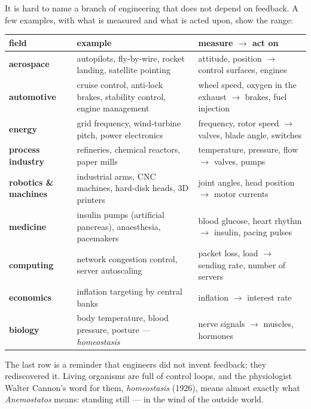 It is hard to name a branch of engineering that does not depend on feedback. A few examples, with what is measured and what is acted upon, show the range:

\begin{center}\small
\renewcommand{\arraystretch}{1.25}
\begin{tabularx}{\linewidth}{@{}>{\sffamily\bfseries}p{23mm}>{\raggedright\arraybackslash}X>{\raggedright\arraybackslash}p{36mm}@{}}
\toprule
\normalfont\sffamily field & example & measure $\rightarrow$ act on\\
\midrule
aerospace & autopilots, fly-by-wire, rocket landing, satellite pointing & attitude, position $\rightarrow$ control surfaces, engines\\
automotive & cruise control, anti-lock brakes, stability control, engine management & wheel speed, oxygen in the exhaust $\rightarrow$ brakes, fuel injection\\
energy & grid frequency, wind-turbine pitch, power electronics & frequency, rotor speed $\rightarrow$ valves, blade angle, switches\\
process industry & refineries, chemical reactors, paper mills & temperature, pressure, flow $\rightarrow$ valves, pumps\\
robotics \& machines & industrial arms, CNC machines, hard-disk heads, 3D printers & joint angles, head position $\rightarrow$ motor currents\\
medicine & insulin pumps (artificial pancreas), anaesthesia, pacemakers & blood glucose, heart rhythm $\rightarrow$ insulin, pacing pulses\\
computing & network congestion control, server autoscaling & packet loss, load $\rightarrow$ sending rate, number of servers\\
economics & inflation targeting by central banks & inflation $\rightarrow$ interest rate\\
biology & body temperature, blood pressure, posture — \emph{homeostasis} & nerve signals $\rightarrow$ muscles, hormones\\
\bottomrule
\end{tabularx}
\end{center}

The last row is a reminder that engineers did not invent feedback; they rediscovered it. Living organisms are full of control loops, and the physiologist Walter Cannon's word for them, \emph{homeostasis} (1926), means almost exactly what \emph{Anemostatos} means: standing still — in the wind of the outside world.

